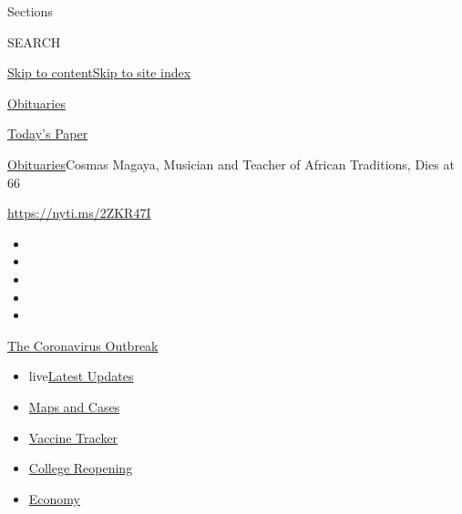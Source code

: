 Sections

SEARCH

\protect\hyperlink{site-content}{Skip to
content}\protect\hyperlink{site-index}{Skip to site index}

\href{https://www.nytimes3xbfgragh.onion/section/obituaries}{Obituaries}

\href{https://myaccount.nytimes3xbfgragh.onion/auth/login?response_type=cookie\&client_id=vi}{}

\href{https://www.nytimes3xbfgragh.onion/section/todayspaper}{Today's
Paper}

\href{/section/obituaries}{Obituaries}\textbar{}Cosmas Magaya, Musician
and Teacher of African Traditions, Dies at 66

\url{https://nyti.ms/2ZKR47I}

\begin{itemize}
\item
\item
\item
\item
\item
\end{itemize}

\href{https://www.nytimes3xbfgragh.onion/news-event/coronavirus?action=click\&pgtype=Article\&state=default\&region=TOP_BANNER\&context=storylines_menu}{The
Coronavirus Outbreak}

\begin{itemize}
\tightlist
\item
  live\href{https://www.nytimes3xbfgragh.onion/2020/08/04/world/coronavirus-covid-19.html?action=click\&pgtype=Article\&state=default\&region=TOP_BANNER\&context=storylines_menu}{Latest
  Updates}
\item
  \href{https://www.nytimes3xbfgragh.onion/interactive/2020/us/coronavirus-us-cases.html?action=click\&pgtype=Article\&state=default\&region=TOP_BANNER\&context=storylines_menu}{Maps
  and Cases}
\item
  \href{https://www.nytimes3xbfgragh.onion/interactive/2020/science/coronavirus-vaccine-tracker.html?action=click\&pgtype=Article\&state=default\&region=TOP_BANNER\&context=storylines_menu}{Vaccine
  Tracker}
\item
  \href{https://www.nytimes3xbfgragh.onion/2020/08/02/us/covid-college-reopening.html?action=click\&pgtype=Article\&state=default\&region=TOP_BANNER\&context=storylines_menu}{College
  Reopening}
\item
  \href{https://www.nytimes3xbfgragh.onion/live/2020/08/03/business/stock-market-today-coronavirus?action=click\&pgtype=Article\&state=default\&region=TOP_BANNER\&context=storylines_menu}{Economy}
\end{itemize}


